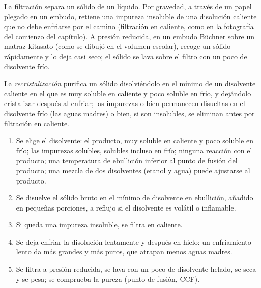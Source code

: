 La filtración separa un sólido de un líquido. Por gravedad, a través de
un papel plegado en un embudo, retiene una impureza insoluble de una
disolución caliente que no debe enfriarse por el camino (filtración en
caliente, como en la fotografía del comienzo del capítulo). A presión
reducida, en un embudo Büchner sobre un matraz kitasato (como se dibujó
en el volumen escolar), recoge un sólido rápidamente y lo deja casi seco;
el sólido se lava sobre el filtro con un poco de disolvente frío.

\begin{definition}[Recristalización]\label{def:b1:lab-techniques-1:recrystallisation}
La \emph{recristalización} purifica un sólido
disolviéndolo en el mínimo de un disolvente caliente en el que es muy
soluble en caliente y poco soluble en frío, y dejándolo cristalizar
después al enfriar; las impurezas o bien permanecen disueltas en el
disolvente frío (las aguas madres) o bien, si son insolubles, se eliminan
antes por filtración en caliente.
\end{definition}

\begin{method}\label{met:b1:lab-techniques-1:recrystallise}
\begin{enumerate}
  \item Se elige el disolvente: el producto, muy soluble en caliente y
        poco soluble en frío; las impurezas solubles, solubles incluso en
        frío; ninguna reacción con el producto; una temperatura de
        ebullición inferior al punto de fusión del producto; una mezcla
        de dos disolventes  (etanol y agua) puede ajustarse al
        producto.
  \item Se disuelve el sólido bruto en el mínimo de disolvente en
        ebullición, añadido en pequeñas porciones, a reflujo si el
        disolvente es volátil o inflamable.
  \item Si queda una impureza insoluble, se filtra en caliente.
  \item Se deja enfriar la disolución lentamente y después en hielo: un
        enfriamiento lento da  más grandes y más puros, que
        atrapan menos aguas madres.
  \item Se filtra a presión reducida, se lava con un poco de disolvente
        helado, se seca y se pesa; se comprueba la pureza (punto de
        fusión, CCF).
\end{enumerate}
\end{method}

